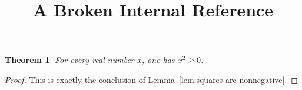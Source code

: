 \documentclass{article}
\title{A Broken Internal Reference}
\author{}
\date{}
\newtheorem{theorem}{Theorem}
\begin{document}
\maketitle

\begin{theorem}\label{thm:square-nonnegative}
For every real number $x$, one has $x^2\geq 0$.
\end{theorem}
\begin{proof}
This is exactly the conclusion of Lemma~\ref{lem:squares-are-nonnegative}.
\end{proof}
\end{document}

